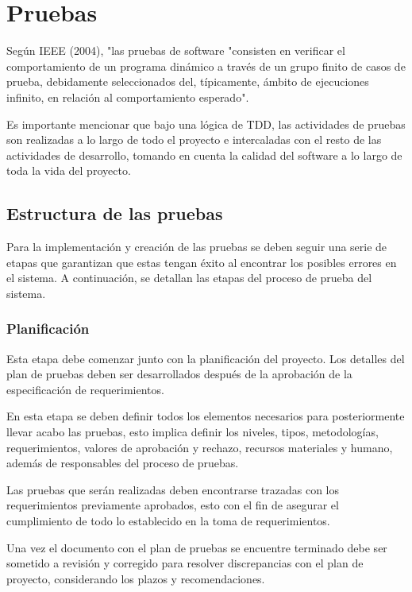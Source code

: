
\chapter{Pruebas}

Según IEEE (2004), "las pruebas de software "consisten en verificar el comportamiento de un programa dinámico a través de un grupo finito de casos de prueba, debidamente seleccionados del, típicamente, ámbito de ejecuciones infinito, en relación al comportamiento esperado".

Es importante mencionar que bajo una lógica de TDD, las actividades de pruebas son realizadas a lo largo de todo el proyecto e intercaladas con el resto de las actividades de desarrollo, tomando en cuenta la calidad del software a lo largo de toda la vida del proyecto. 


\section{Estructura de las pruebas}

Para la implementación y creación de las pruebas se deben seguir una serie de etapas que garantizan que estas tengan éxito al encontrar los posibles errores en el sistema. A continuación, se detallan las etapas del proceso de prueba del sistema.

\subsection{Planificación}

Esta etapa debe comenzar junto con la planificación del proyecto. Los detalles del plan de pruebas deben ser desarrollados después de la aprobación de la especificación de requerimientos.

En esta etapa se deben definir todos los elementos necesarios para posteriormente llevar acabo las pruebas, esto implica definir los niveles, tipos, metodologías, requerimientos, valores de aprobación y rechazo, recursos materiales y humano, además de responsables del proceso de pruebas.

Las pruebas que serán realizadas deben encontrarse trazadas con los requerimientos previamente aprobados, esto con el fin de asegurar el cumplimiento de todo lo establecido en la toma de requerimientos.

Una vez el documento con el plan de pruebas se encuentre terminado debe ser sometido a revisión y corregido para resolver discrepancias con el plan de proyecto, considerando los plazos y recomendaciones.

